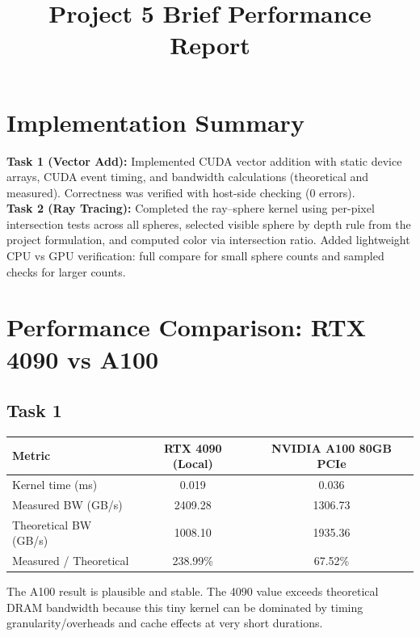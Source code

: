 \documentclass[11pt]{article}
\title{Project 5 Brief Performance Report}
\author{}
\date{}
\begin{document}
\maketitle

\section*{Implementation Summary}
\textbf{Task 1 (Vector Add):} Implemented CUDA vector addition with static device arrays, CUDA event timing, and bandwidth calculations (theoretical and measured). Correctness was verified with host-side checking (0 errors).\\
\textbf{Task 2 (Ray Tracing):} Completed the ray--sphere kernel using per-pixel intersection tests across all spheres, selected visible sphere by depth rule from the project formulation, and computed color via intersection ratio. Added lightweight CPU vs GPU verification: full compare for small sphere counts and sampled checks for larger counts.

\section*{Performance Comparison: RTX 4090 vs A100}

\subsection*{Task 1}
\begin{table}[h!]
\centering
\begin{tabular}{lcc}
\toprule
Metric & RTX 4090 (Local) & NVIDIA A100 80GB PCIe \\
\midrule
Kernel time (ms) & 0.019 & 0.036 \\
Measured BW (GB/s) & 2409.28 & 1306.73 \\
Theoretical BW (GB/s) & 1008.10 & 1935.36 \\
Measured / Theoretical & 238.99\% & 67.52\% \\
\bottomrule
\end{tabular}
\end{table}

\noindent The A100 result is plausible and stable. The 4090 value exceeds theoretical DRAM bandwidth because this tiny kernel can be dominated by timing granularity/overheads and cache effects at very short durations.
\end{document}
